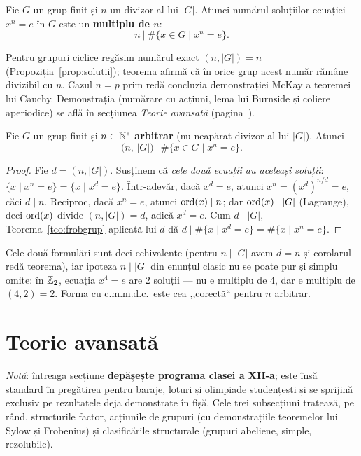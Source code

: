 \begin{teorema}[Frobenius, 1895]\label{teo:frobgrup}
Fie $G$ un grup finit și $n$ un divizor al lui $|G|$. Atunci numărul soluțiilor ecuației $x^n=e$ în $G$ este un \textbf{multiplu de $n$}:
\[
n\ \Big|\ \#\{x\in G\mid x^n=e\}.
\]
\end{teorema}

Pentru grupuri ciclice regăsim numărul exact $(n,|G|)=n$ (Propoziția~\ref{prop:solutii}); teorema afirmă că în orice grup acest număr rămâne divizibil cu $n$. Cazul $n=p$ prim redă concluzia demonstrației McKay a teoremei lui Cauchy. Demonstrația (numărare cu acțiuni, lema lui Burnside și coliere aperiodice) se află în secțiunea \emph{Teorie avansată} (pagina~\pageref{dem:frobenius}).

\begin{corolar}\label{cor:frobgcd}
Fie $G$ un grup finit și $n\in\mathbb{N}^*$ \textbf{arbitrar} (nu neapărat divizor al lui $|G|$). Atunci
\[
\bigl(n,\,|G|\bigr)\ \Big|\ \#\{x\in G\mid x^n=e\}.
\]
\end{corolar}

\begin{proof}
Fie $d=(n,|G|)$. Susținem că \emph{cele două ecuații au aceleași soluții}: $\{x\mid x^n=e\}=\{x\mid x^d=e\}$. Într-adevăr, dacă $x^d=e$, atunci $x^n=(x^d)^{n/d}=e$, căci $d\mid n$. Reciproc, dacă $x^n=e$, atunci $\operatorname{ord}(x)\mid n$; dar $\operatorname{ord}(x)\mid|G|$ (Lagrange), deci $\operatorname{ord}(x)$ divide $(n,|G|)=d$, adică $x^d=e$. Cum $d\mid|G|$, Teorema~\ref{teo:frobgrup} aplicată lui $d$ dă $d\mid\#\{x\mid x^d=e\}=\#\{x\mid x^n=e\}$.
\end{proof}

\begin{obs}
Cele două formulări sunt deci echivalente (pentru $n\mid|G|$ avem $d=n$ și corolarul redă teorema), iar ipoteza $n\mid|G|$ din enunțul clasic nu se poate pur și simplu omite: în $\mathbb{Z}_2$, ecuația $x^4=e$ are $2$ soluții --- nu e multiplu de $4$, dar e multiplu de $(4,2)=2$. Forma cu c.m.m.d.c.\ este cea ,,corectă`` pentru $n$ arbitrar.
\end{obs}

\section{Teorie avansată}\label{sec:avansat}

\emph{Notă}: întreaga secțiune \textbf{depășește programa clasei a XII-a}; este însă standard în pregătirea pentru baraje, loturi și olimpiade studențești și se sprijină exclusiv pe rezultatele deja demonstrate în fișă. Cele trei subsecțiuni tratează, pe rând, structurile factor, acțiunile de grupuri (cu demonstrațiile teoremelor lui Sylow și Frobenius) și clasificările structurale (grupuri abeliene, simple, rezolubile).

